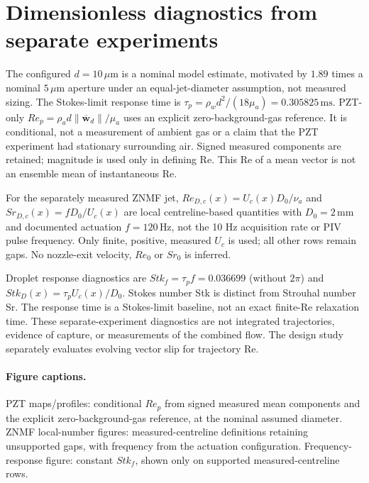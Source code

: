 \section{Dimensionless diagnostics from separate experiments}
The configured $d=10\,\mu\mathrm{m}$ is a nominal model estimate, motivated by
$1.89$ times a nominal $5\,\mu\mathrm{m}$ aperture under an equal-jet-diameter
assumption, not measured sizing. The Stokes-limit response time is
$\tau_p=\rho_w d^2/(18\mu_a)=0.305825\,\mathrm{ms}$.
PZT-only $Re_p=\rho_a d\lVert\overline{\boldsymbol w}_d\rVert/\mu_a$ uses an
explicit zero-background-gas reference. It is conditional, not a measurement of
ambient gas or a claim that the PZT experiment had stationary surrounding air.
Signed measured components are retained; magnitude is used only in defining Re.
This Re of a mean vector is not an ensemble mean of instantaneous Re.

For the separately measured ZNMF jet, $Re_{D,c}(x)=U_c(x)D_0/\nu_a$ and
$Sr_{D,c}(x)=fD_0/U_c(x)$ are local centreline-based quantities with
$D_0=2\,$mm and documented actuation $f=120\,$Hz, not the
10 Hz acquisition rate or PIV pulse frequency.
Only finite, positive, measured $U_c$ is used; all other rows remain gaps.
No nozzle-exit velocity, $Re_0$ or $Sr_0$ is inferred.

Droplet response diagnostics are $Stk_f=\tau_p f=0.036699$ (without $2\pi$)
and $Stk_D(x)=\tau_p U_c(x)/D_0$. Stokes number Stk is distinct from
Strouhal number Sr. The response time is a Stokes-limit baseline, not an exact
finite-Re relaxation time. These separate-experiment diagnostics are not
integrated trajectories, evidence of capture, or measurements of the combined flow.
The design study separately evaluates evolving vector slip for trajectory Re.

\paragraph{Figure captions.}
PZT maps/profiles: conditional $Re_p$ from signed measured mean components and
the explicit zero-background-gas reference, at the nominal assumed diameter.
ZNMF local-number figures: measured-centreline definitions retaining unsupported
gaps, with frequency from the actuation configuration. Frequency-response figure:
constant $Stk_f$, shown only on supported measured-centreline rows.
